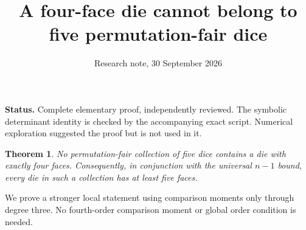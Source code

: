 \documentclass[11pt]{article}
\title{A four-face die cannot belong to five permutation-fair dice}
\author{Research note, 30 September 2026}
\date{}
\newtheorem{theorem}{Theorem}
\begin{document}
\maketitle
\noindent\textbf{Status.} Complete elementary proof, independently reviewed.
The symbolic determinant identity is checked by the accompanying exact
script. Numerical exploration suggested the proof but is not used in it.

\begin{theorem}\label{thm:no4}
No permutation-fair collection of five dice contains a die with exactly
four faces. Consequently, in conjunction with the universal $n-1$ bound,
every die in such a collection has at least five faces.
\end{theorem}

We prove a stronger local statement using comparison moments only through
degree three. No fourth-order comparison moment or global order condition
is needed.
\end{document}
